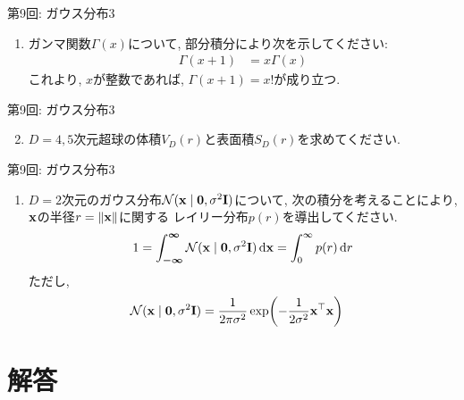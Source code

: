 \documentclass[dvipdfmx,notheorems,t]{beamer}
\begin{document}
\begin{frame}{第9回: ガウス分布3}
\begin{enumerate}
  \item ガンマ関数$\Gamma(x)$について, 部分積分により次を示してください:
  \begin{align*}
    \Gamma(x + 1) &= x \Gamma(x)
  \end{align*}
  これより, $x$が整数であれば, $\Gamma(x + 1) = x!$が成り立つ.
\end{enumerate}
\end{frame}

\begin{frame}{第9回: ガウス分布3}
\begin{enumerate}
  \setcounter{enumi}{1}
  \item $D = 4, 5$次元超球の体積$V_D(r)$と表面積$S_D(r)$を求めてください.
\end{enumerate}
\end{frame}

\begin{frame}{第9回: ガウス分布3}
\begin{enumerate}
  \item $D = 2$次元のガウス分布$\mathcal{N}(\vb{x} \mid \vb{0}, \sigma^2 \vb{I})$について,
  次の積分を考えることにより, $\vb{x}$の半径$r = \left\| \vb{x} \right\|$に関する
  レイリー分布$p(r)$を導出してください.
  \begin{align*}
    1 = \int_{\boldsymbol{-\infty}}^{\boldsymbol{\infty}}
      \mathcal{N}(\vb{x} \mid \vb{0}, \sigma^2 \vb{I}) \dd{\vb{x}}
      = \int_0^\infty p(r) \dd{r}
  \end{align*}
  ただし,
  \begin{align*}
    \mathcal{N}(\vb{x} \mid \vb{0}, \sigma^2 \vb{I})
      &= \frac{1}{2\pi \sigma^2} \exp(-\frac{1}{2 \sigma^2} \vb{x}^\top \vb{x})
  \end{align*}
\end{enumerate}
\end{frame}

\begin{frame}{}
\end{frame}

\section{解答}
\end{document}
